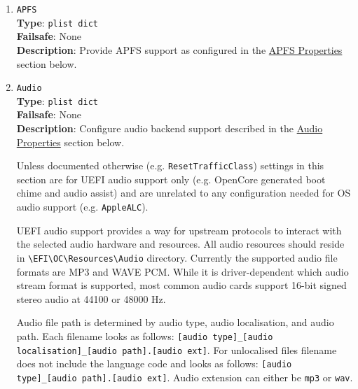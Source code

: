 \documentclass[]{article}
\begin{document}
\begin{enumerate}
\item
  \texttt{APFS}\\
  \textbf{Type}: \texttt{plist\ dict}\\
  \textbf{Failsafe}: None\\
  \textbf{Description}: Provide APFS support as configured in the
  \hyperref[uefiapfsprops]{APFS Properties} section below.

\item
  \texttt{Audio}\\
  \textbf{Type}: \texttt{plist\ dict}\\
  \textbf{Failsafe}: None\\
  \textbf{Description}: Configure audio backend support described
  in the \hyperref[uefiaudioprops]{Audio Properties} section below.

  Unless documented otherwise (e.g. \texttt{ResetTrafficClass}) settings in this section
  are for UEFI audio support only (e.g. OpenCore generated boot chime and audio assist) and are
  unrelated to any configuration needed for OS audio support (e.g. \texttt{AppleALC}).

  UEFI audio support provides a way for upstream protocols to interact with the
  selected audio hardware and resources. All audio resources should reside
  in \texttt{\textbackslash EFI\textbackslash OC\textbackslash Resources\textbackslash Audio}
  directory. Currently the supported audio file formats are MP3 and WAVE PCM. While it is
  driver-dependent which audio stream format is supported, most common audio cards
  support 16-bit signed stereo audio at 44100 or 48000 Hz.

  Audio file path is determined by audio type, audio localisation, and audio path. Each filename
  looks as follows: \texttt{[audio type]\_[audio localisation]\_[audio path].[audio ext]}.
  For unlocalised files filename does not include the language code and looks as follows:
  \texttt{[audio type]\_[audio path].[audio ext]}. Audio extension can either be \texttt{mp3}
  or \texttt{wav}.


\end{enumerate}
\end{document}

